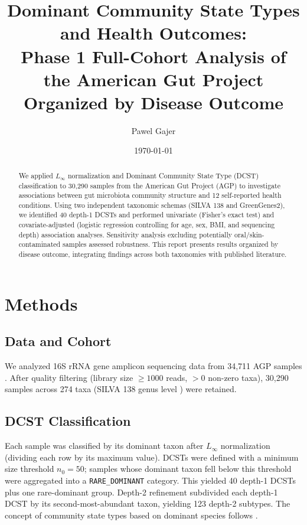 \documentclass[11pt,a4paper]{article}
\title{\textbf{Dominant Community State Types and Health Outcomes:\\Phase 1 Full-Cohort Analysis of the American Gut Project}\\[0.5em]\large Organized by Disease Outcome}
\author{Pawel Gajer}
\date{\today}
\begin{document}
\maketitle

\begin{abstract}
We applied $L_\infty$ normalization and Dominant Community State Type (DCST) classification to 30,290 samples from the American Gut Project (AGP) to investigate associations between gut microbiota community structure and 12 self-reported health conditions. Using two independent taxonomic schemas (SILVA 138 and GreenGenes2), we identified 40 depth-1 DCSTs and performed univariate (Fisher's exact test) and covariate-adjusted (logistic regression controlling for age, sex, BMI, and sequencing depth) association analyses. Sensitivity analysis excluding potentially oral/skin-contaminated samples assessed robustness. This report presents results organized by disease outcome, integrating findings across both taxonomies with published literature.
\end{abstract}

\tableofcontents
\newpage

\section{Methods}

\subsection{Data and Cohort}
We analyzed 16S rRNA gene amplicon sequencing data from 34,711 AGP samples \cite{McDonald2018_AGP}. After quality filtering (library size $\geq 1000$ reads, $>0$ non-zero taxa), 30,290 samples across 274 taxa (SILVA 138 genus level \cite{Quast2013_SILVA}) were retained.

\subsection{DCST Classification}
Each sample was classified by its dominant taxon after $L_\infty$ normalization (dividing each row by its maximum value). DCSTs were defined with a minimum size threshold $n_0=50$; samples whose dominant taxon fell below this threshold were aggregated into a \texttt{RARE\_DOMINANT} category. This yielded 40 depth-1 DCSTs plus one rare-dominant group. Depth-2 refinement subdivided each depth-1 DCST by its second-most-abundant taxon, yielding 123 depth-2 subtypes. The concept of community state types based on dominant species follows \citet{Gajer2012_CST}.
\end{document}
